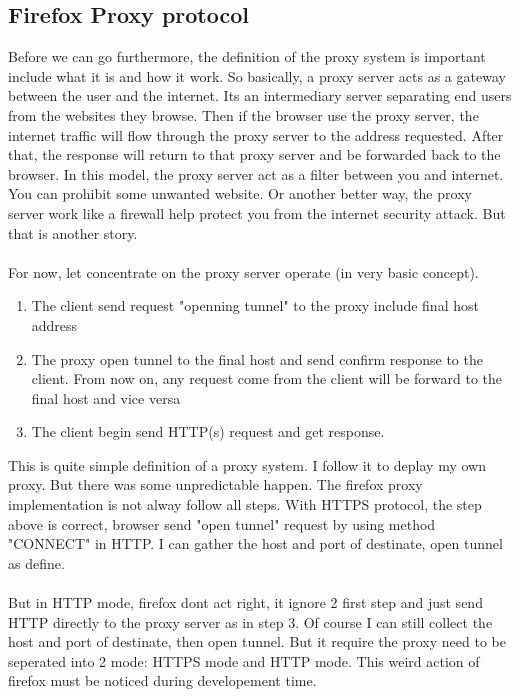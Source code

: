 \documentclass{article}
\begin{document}
\subsection{Firefox Proxy protocol}
Before we can go furthermore, the definition of the proxy system is important
include what it is and how it work. So basically, a proxy server acts as a
gateway between the user and the internet. Its an intermediary server separating
end users from the websites they browse. Then if the browser use the proxy server,
the internet traffic will flow through the proxy server to the address requested.
After that, the response will return to that proxy server and be forwarded back to
the browser. In this model, the proxy server act as a filter between you and internet.
You can prohibit some unwanted website. Or another better way, the proxy server work
like a firewall help protect you from the internet security attack. But that is
another story.\\
\\
For now, let concentrate on the proxy server operate (in very basic concept).
\begin{enumerate}
\item The client send request "openning tunnel" to the proxy include final host address
\item The proxy open tunnel to the final host and send confirm response to the client.
From now on, any request come from the client will be forward to the final host and vice versa
\item The client begin send HTTP(s) request and get response.
\end{enumerate}
This is quite simple definition of a proxy system. I follow it to deplay my own proxy. But
there was some unpredictable happen. The firefox proxy implementation is not alway follow
all steps. With HTTPS protocol, the step above is correct, browser send "open tunnel" request
by using method "CONNECT" in HTTP. I can gather the host and port of destinate, open tunnel
as define.\\
\\
But in HTTP mode, firefox dont act right, it ignore 2 first step and just send HTTP directly
to the proxy server as in step 3. Of course I can still collect the host and port of destinate,
then open tunnel. But it require the proxy need to be seperated into 2 mode: HTTPS mode and HTTP
mode. This weird action of firefox must be noticed during developement time.
\end{document}
